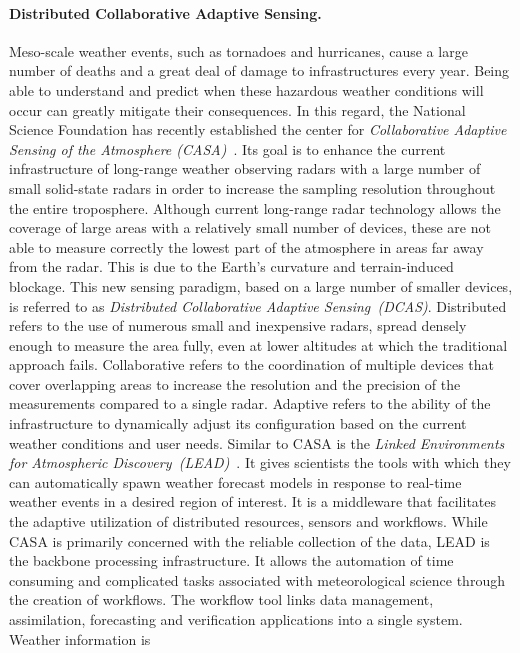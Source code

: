 \paragraph{Distributed Collaborative Adaptive Sensing.} Meso-scale weather events, such as tornadoes and
hurricanes, cause a large number of deaths and a great deal of damage to infrastructures every year.
Being able to understand and predict when these hazardous weather conditions will occur can greatly
mitigate their consequences.
In this regard, the National Science Foundation has recently established the center for
\textit{Collaborative Adaptive Sensing of the Atmosphere (CASA)}~\cite{casa}. Its goal is to
enhance the current infrastructure of long-range weather observing radars with a large number of small
solid-state radars in order to increase the sampling resolution throughout the entire
troposphere.
Although current \mbox{long-range} radar technology allows the coverage of large areas with a relatively
small number of devices, these are not able to measure correctly the lowest part of the atmosphere in
areas far away from the radar. This is due to the Earth's curvature and terrain-induced blockage.  This
new sensing paradigm, based on a large number of smaller devices, is referred to as \emph{Distributed
Collaborative Adaptive Sensing~(DCAS)}. Distributed refers to the use of numerous small and inexpensive
radars, spread densely enough to measure the area fully, even at lower altitudes at which the traditional
approach fails.
Collaborative refers to the coordination of multiple devices that cover overlapping areas to increase
the resolution and the precision of the measurements compared to a single radar. Adaptive refers to the
ability of the infrastructure to dynamically adjust its configuration based on the current weather
conditions and user needs.
Similar to CASA is the \emph{Linked Environments for Atmospheric
Discovery~(LEAD)}~\cite{lead}. It gives scientists the tools with which they can automatically spawn
weather forecast models in response to real-time weather events in a desired region of interest. It is a
middleware that facilitates the adaptive utilization of distributed resources, sensors and workflows.
While CASA is primarily concerned with the reliable collection of the data, LEAD is the backbone
processing infrastructure. It allows the automation of time consuming and complicated tasks associated
with meteorological science through the creation of workflows. The workflow tool links data management,
assimilation, forecasting and verification applications into a single system. Weather information is
